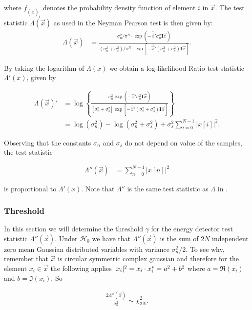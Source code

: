 \documentclass[a4paper, openany, oneside]{memoir}
\begin{document}
where $f_{(\vec{x})_i}$ denotes the probability density function of element $i$ in $\vec{x}$.  The test statistic $\Lambda(\vec{x})$ as used in the Neyman Pearson test is then given by:
\begin{align*}
\Lambda(\vec{x}) &=\frac{\sigma_n^2/\pi^N \cdot \exp(-\bar{\vec{x}}'\sigma_n^2\mathbf{I}\vec{x})}{(\sigma_n^2 + \sigma_s^2)/\pi^N \cdot \exp[-\bar{\vec{x}}'(\sigma_n^2+\sigma_s^2)\mathbf{I}\vec{x}]}.
\end{align*}


By taking the logarithm of $\Lambda(x)$ we obtain a log-likelihood Ratio test statistic $\Lambda'(x)$, given by

\begin{align*}
\Lambda(\vec{x})' &= \log \left\{
\frac{\sigma_n^2\exp(-\overline{\vec{x}}'\sigma_n^2\mathbf{I}\vec{x})}{[\sigma_n^2 + \sigma_s^2]\exp[-\bar{\vec{x}}'(\sigma_n^2+\sigma_s^2)\mathbf{I}\vec{x}]}\right\} \\
&= \log(\sigma_n^2) - \log(\sigma_n^2 + \sigma_s^2) +  \sigma_s^2 \sum_{i=0}^{N-1} |x[i]|^2. 
\end{align*}

Observing that the constants $\sigma_n$ and $\sigma_s$ do not depend on value of the samples, the test statistic 

\begin{align*}
\Lambda''(\vec{x}) &= \sum_{n=0}^{N-1} |x[n]|^2
\end{align*} 

is proportional to $\Lambda'(x)$. Note that $\Lambda''$ is the same test statistic as $\Lambda$ in .

\subsubsection{Threshold}
In this section we will determine the threshold $\gamma$ for the energy detector test statistic $\Lambda''(\vec{x})$.
Under $\mathcal{H}_0$ we have that $\Lambda''(\vec{x})$ is the sum of $2N$ independent zero mean Gaussian distributed variables
with variance $\sigma_n^2/2$. To see why, remember that $\vec{x}$ is circular symmetric complex gaussian and therefore for the element $x_i \in \vec{x}$ the following applies
$|x_i|^2 = x_i \cdot x_i^* = a^2 + b^2$ where $a = \Re(x_i)$ and $b=\Im(x_i)$.  So

\begin{align}
    \frac{2\Lambda''(\vec{x})}{\sigma_n^2} \sim \chi^2_{2N}.
\end{align}
\end{document}
